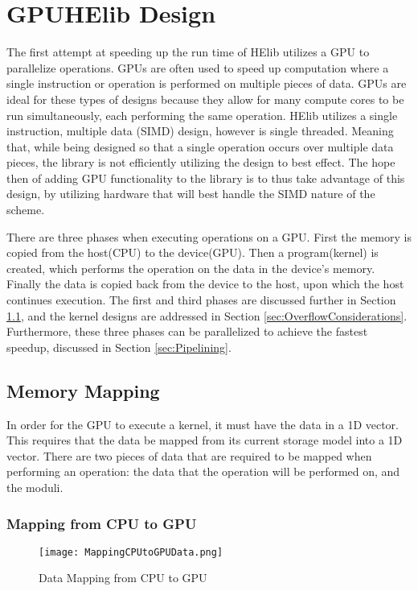 \chapter{GPUHElib Design} \label{chap:GPUHElibDesign}
The first attempt at speeding up the run time of HElib utilizes a GPU to parallelize operations. GPUs are often used to speed up computation where a single instruction or operation is performed on multiple pieces of data. GPUs are ideal for these types of designs because they allow for many compute cores to be run simultaneously, each performing the same operation. HElib utilizes a single instruction, multiple data (SIMD) design, however is single threaded. Meaning that, while being designed so that a single operation occurs over multiple data pieces, the library is not efficiently utilizing the design to best effect. The hope then of adding GPU functionality to the library is to thus take advantage of this design, by utilizing hardware that will best handle the SIMD nature of the scheme. 

There are three phases when executing operations on a GPU. First the memory is copied from the host(CPU) to the device(GPU). Then a program(kernel) is created, which performs the operation on the data in the device's memory. Finally the data is copied back from the device to the host, upon which the host continues execution. The first and third phases are discussed further in Section \ref{sec:MemoryMapping}, and the kernel designs are addressed in Section \ref{sec:OverflowConsiderations}. Furthermore, these three phases can be parallelized to achieve the fastest speedup, discussed in Section \ref{sec:Pipelining}.

\section{Memory Mapping} \label{sec:MemoryMapping}
In order for the GPU to execute a kernel, it must have the data in a 1D vector. This requires that the data be mapped from its current storage model into a 1D vector. There are two pieces of data that are required to be mapped when performing an operation: the data that the operation will be performed on, and the moduli.

\subsection{Mapping from CPU to GPU}

\begin{figure}[t!]
\centering
\texttt{[image: MappingCPUtoGPUData.png]}
\caption{Data Mapping from CPU to GPU}
\label{fig:MappingCPUtoGPUData}
\end{figure}

